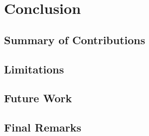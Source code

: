 
%

\chapter{Conclusion}
\label{cha:conclusion}

\section{Summary of Contributions}
\label{sec:conclusion-contributions}



\section{Limitations}
\label{sec:limitations}



\section{Future Work}
\label{sec:future-work}



\section{Final Remarks}
\label{sec:final-remarks}

